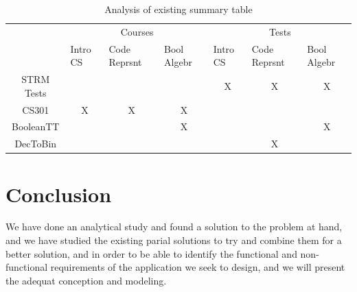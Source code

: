 \begin{table}[h!]
\begin{center}
		\begin{tabular}{c|lll|lcl|}
		\cline{2-7}
		\multicolumn{1}{l|}{}                   & \multicolumn{3}{c|}{Courses}                                                                                                                     & \multicolumn{3}{c|}{Tests}                                                                                                                       \\ \cline{2-7} 
		\multicolumn{1}{l|}{\multirow{-2}{*}{}} & \multicolumn{1}{l|}{Intro CS}                  & \multicolumn{1}{l|}{Code Reprsnt}              & Bool Algebr                                    & \multicolumn{1}{l|}{Intro CS}                  & \multicolumn{1}{l|}{Code Reprsnt}              & Bool Algebr                                    \\ \hline
		\multicolumn{1}{|c|}{STRM Tests}        & \multicolumn{1}{l|}{}                          & \multicolumn{1}{l|}{}                          &                                                & \multicolumn{1}{c|}{\cellcolor[HTML]{96FFFB}X} & \multicolumn{1}{c|}{\cellcolor[HTML]{96FFFB}X} & \multicolumn{1}{c|}{\cellcolor[HTML]{96FFFB}X} \\ \hline
		\multicolumn{1}{|c|}{CS301}             & \multicolumn{1}{c|}{\cellcolor[HTML]{96FFFB}X} & \multicolumn{1}{c|}{\cellcolor[HTML]{96FFFB}X} & \multicolumn{1}{c|}{\cellcolor[HTML]{96FFFB}X} & \multicolumn{1}{l|}{}                          & \multicolumn{1}{l|}{}                          &                                                \\ \hline
		\multicolumn{1}{|c|}{BooleanTT}         & \multicolumn{1}{l|}{}                          & \multicolumn{1}{l|}{}                          & \multicolumn{1}{c|}{\cellcolor[HTML]{96FFFB}X} & \multicolumn{1}{l|}{}                          & \multicolumn{1}{c|}{\cellcolor[HTML]{FFFFFF}}  & \multicolumn{1}{c|}{\cellcolor[HTML]{96FFFB}X} \\ \hline
		\multicolumn{1}{|c|}{DecToBin}          & \multicolumn{1}{l|}{}                          & \multicolumn{1}{l|}{}                          &                                                & \multicolumn{1}{l|}{}                          & \multicolumn{1}{c|}{\cellcolor[HTML]{96FFFB}X} &                                                \\ \hline
		\end{tabular}
\end{center}
\caption{Analysis of existing summary table}
\label{tab:AnalysisOfExistingSummaryTable}
\end{table}


\section{Conclusion}
We have done an analytical study and found a solution to the problem at hand, and we have studied the existing parial solutions to try and combine them for a better solution, and in order to be able
to identify the functional and non-functional requirements of the application we seek to
design, and we will present the adequat conception and modeling.
